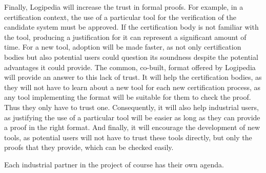 Finally, Logipedia will increase the trust in formal proofs. For
example, in a certification context, the use of a particular tool for
the verification of the candidate system must be approved. If the
certification body is not familiar with the tool, producing a
justification for it can represent a significant amount of time. For a
new tool, adoption will be made faster, as not only certification
bodies but also potential users could question its soundness despite
the potential advantages it could provide. The common, co-built,
format offered by Logipedia will provide an answer to this lack of
trust. It will help the certification bodies, as they will not have to
learn about a new tool for each new certification process, as any tool
implementing the format will be suitable for them to check the
proof. Thus they only have to trust one. Consequently, it will also
help industrial users, as justifying the use of a particular tool will
be easier as long as they can provide a proof in the right format. And
finally, it will encourage the development of new tools, as potential
users will not have to trust these tools directly, but only the proofs
that they provide, which can be checked easily.

Each industrial partner in the project of course has their own agenda.


